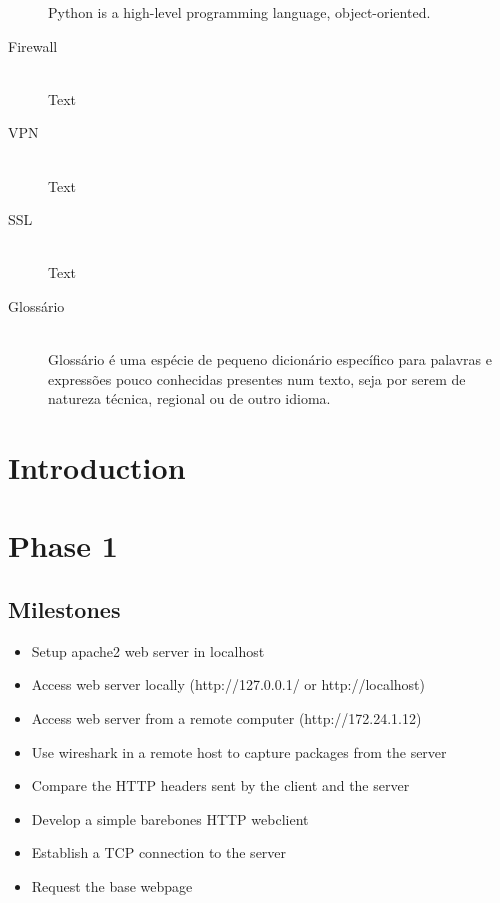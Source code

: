 \documentclass[11pt,a4paper]{report}
\begin{document}
\begin{description}
        Python is a high-level programming language, object-oriented.
    \item[Firewall] \hfill \\
        Text
    \item[VPN] \hfill \\
        Text
    \item[SSL] \hfill \\
        Text
    \item[Glossário] \hfill \\
        Glossário é uma espécie de pequeno dicionário específico para palavras e expressões pouco conhecidas presentes num texto, seja por serem de natureza técnica, regional ou de outro idioma.
\end{description}

\chapter{Introduction}
\pagestyle{fancy}
\setcounter{page}{1}

\chapter{Phase 1}
    \section{Milestones}
        \begin{itemize}
            \item Setup apache2 web server in localhost
            \item Access web server locally (http://127.0.0.1/ or http://localhost)
            \item Access web server from a remote computer (http://172.24.1.12)
            \item Use wireshark in a remote host to capture packages from the server
            \item Compare the HTTP headers sent by the client and the server
            \item Develop a simple barebones HTTP webclient
            \item Establish a TCP connection to the server
            \item Request the base webpage
        \end{itemize}
        
\end{document}
